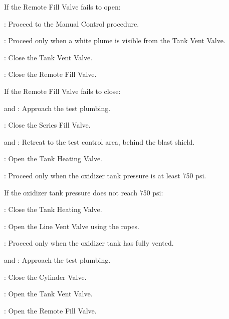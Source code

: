 \begin{checklist}
\begin{checklist}[label=$\bullet$]
\begin{checklist}
        \end{checklist}
        \item If the Remote Fill Valve fails to open:
        \begin{checklist}
            \item \ops{}: Proceed to the Manual Control procedure.
        \end{checklist}
    \end{checklist}
    \item \secondary{}: Proceed only when a white plume is visible from the Tank Vent Valve.
    \item \primary{}: Close the Tank Vent Valve.
    \item \primary{}: Close the Remote Fill Valve.
    \begin{checklist}[label=$\bullet$]
        \item If the Remote Fill Valve fails to close:
        \begin{checklist}
            \item \primary{} and \secondary: Approach the test plumbing.
            \item \primary{}: Close the Series Fill Valve.
            \item \primary{} and \secondary: Retreat to the test control area, behind the blast shield.
        \end{checklist}
    \end{checklist}
    \item \heat: Open the Tank Heating Valve.
    \item \daq{}: Proceed only when the oxidizer tank pressure is at least 750 psi.
    \begin{checklist}[label=$\bullet$]
        \item If the oxidizer tank pressure does not reach 750 psi:
        \begin{checklist}
            \item \heat: Close the Tank Heating Valve.
            \item \primary{}: Open the Line Vent Valve using the ropes.
            \item \secondary: Proceed only when the oxidizer tank has fully vented.
            \item \primary{} and \secondary: Approach the test plumbing.
            \item \primary{}: Close the Cylinder Valve.
            \item \primary{}: Open the Tank Vent Valve.
            \item \primary{}: Open the Remote Fill Valve.

\end{checklist}
\end{checklist}
\end{checklist}
